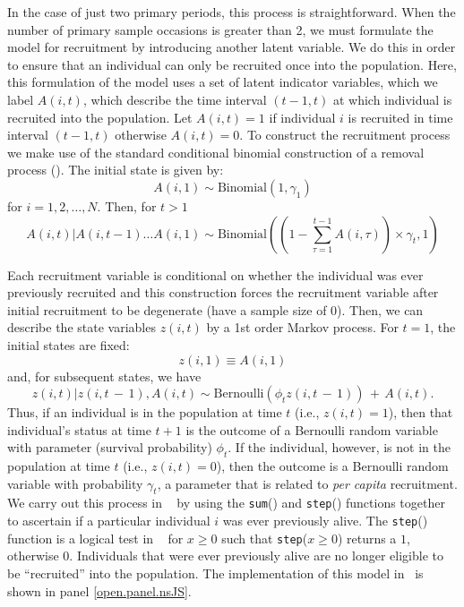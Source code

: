 In the case of just two primary periods, this process is
straightforward.  When the number of primary sample occasions is
greater than 2, we must formulate the model for recruitment by
introducing another latent variable.  We do this in order to ensure
that an individual can only be recruited once into the population.
Here, this formulation of the model uses a set of latent indicator
variables, which we label $A(i,t)$,
which describe the time interval $(t-1, t)$ at
which individual is recruited into the population.  Let $A(i,t) = 1$
if individual $i$ is recruited in time interval $(t-1, t)$ otherwise
$A(i,t)=0$.  To construct the recruitment process we make use of the
standard conditional binomial construction of a removal process
(\citealt{royle_dorazio:2008}).  The initial state is given by:
\[
   A(i,1) \sim \mbox{Binomial}(1, \gamma_{1})
\]
for $i=1,2,\ldots,N$. Then, for $t>1$
\[
 A(i,t)|A(i, t-1) \dots A(i, 1) \sim \mbox{Binomial}((1 - \sum_{\tau=1}^{t-1} A(i, \tau) ) \times \gamma_{t}, 1)
\]

Each recruitment variable is conditional on whether the individual was ever
previously recruited and this construction forces the recruitment
variable after initial recruitment to be degenerate (have a sample
size of 0).  Then, we can describe the state variables $z(i,t)$ by a
1st order Markov process.  For $t=1$, the initial states are fixed:
\[
z(i,1) \equiv A(i,1)
\]
and,
 for subsequent states, we have
\[
z(i,t)|z(i,t\,-\,1),A(i,t)
 \sim \mbox{Bernoulli} (\phi_{t} z(i,t\,-\,1)) \,+ \,  A(i,t).
\]
Thus, if an individual is in the population at time $t$ (i.e., $z(i,t)
= 1$), then that individual's status at time $t+1$ is the outcome of a
Bernoulli random variable with parameter (survival probability)
$\phi_{t}$.  If the individual, however, is not in the population at
time $t$ (i.e., $z(i,t) = 0$), then the outcome is a Bernoulli random
variable with probability $\gamma_{t}$, a parameter that is related to
{\it per capita} recruitment.  We carry out this process in \jags~ by
using the \mbox{\tt sum}() and \mbox{\tt step}() functions together to
ascertain if a particular individual $i$ was ever previously alive.
The \mbox{\tt step}() function is a logical test in \jags~ for $x \geq 0$
such that \mbox{\tt step}($x \geq 0$) returns a $1$, otherwise $0$.
Individuals that were ever previously alive are no longer eligible to
be ``recruited'' into the population.  The implementation of this model
in \jags~is shown in panel \ref{open.panel.nsJS}.


